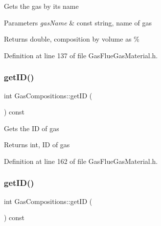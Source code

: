 Gets the gas by its name 
\begin{DoxyParams}{Parameters}
{\em gas\+Name} & const string, name of gas \\
\hline
\end{DoxyParams}
\begin{DoxyReturn}{Returns}
double, composition by volume as \% 
\end{DoxyReturn}


Definition at line 137 of file Gas\+Flue\+Gas\+Material.\+h.

\mbox{\label{class_gas_compositions_a9668decdb2b5065c8ee3c59c207b9d51}} 
\subsubsection{\texorpdfstring{get\+I\+D()}{getID()}\hspace{0.1cm}{\footnotesize\ttfamily [1/3]}}
{\footnotesize\ttfamily int Gas\+Compositions\+::get\+ID (\begin{DoxyParamCaption}{ }\end{DoxyParamCaption}) const\hspace{0.3cm}{\ttfamily [inline]}}

Gets the ID of gas \begin{DoxyReturn}{Returns}
int, ID of gas 
\end{DoxyReturn}


Definition at line 162 of file Gas\+Flue\+Gas\+Material.\+h.

\mbox{\label{class_gas_compositions_a9668decdb2b5065c8ee3c59c207b9d51}} 
\subsubsection{\texorpdfstring{get\+I\+D()}{getID()}\hspace{0.1cm}{\footnotesize\ttfamily [2/3]}}
{\footnotesize\ttfamily int Gas\+Compositions\+::get\+ID (\begin{DoxyParamCaption}{ }\end{DoxyParamCaption}) const\hspace{0.3cm}{\ttfamily [inline]}}

